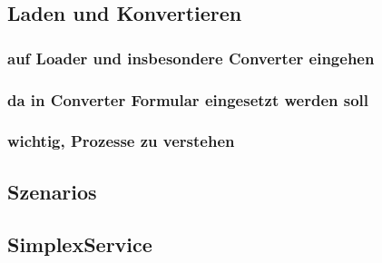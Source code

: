 \documentclass[oneside,a4paper,11pt,openright]{scrreprt}
\begin{document}
\subsection{Laden und Konvertieren}
\subsubsection{auf Loader und insbesondere Converter eingehen}
\subsubsection{da in Converter Formular eingesetzt werden soll}
\subsubsection{wichtig, Prozesse zu verstehen}
\subsection{Szenarios}
\subsection{SimplexService}
\label{sec:simplex-service}

\clearpage




\end{document}
